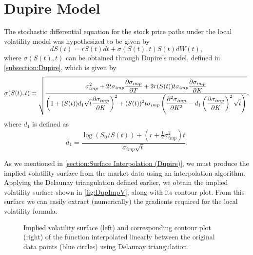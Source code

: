\section{Dupire Model}
The stochastic differential equation for the stock price paths under the local volatility model was hypothesized to be given by
\begin{equation}\label{dupmodds}
dS(t)=rS(t)dt+\sigma(S(t),t)S(t)dW(t),
\end{equation}
\noindent where $\sigma(S(t),t)$ can be obtained through Dupire's model, defined in \autoref{subsection:Dupire}, which is given by
\begin{equation}
\sigma(S(t),t)=\sqrt{\frac{\displaystyle\sigma_{imp}^2+2t\sigma_{imp}\pdv{\sigma_{imp}}{T}+2r(S(t))t\sigma_{imp}\pdv{\sigma_{imp}}{K}}{\displaystyle\left(1+(S(t))d_1\sqrt{t}\pdv{\sigma_{imp}}{K}\right)^2+(S(t))^2t\sigma_{imp}\left(\pdv{^2\sigma_{imp}}{K^2}-d_1\left(\pdv{\sigma_{imp}}{K}\right)^2\sqrt{t}\right)}},
\end{equation}
\noindent where $d_1$ is defined as
\begin{equation}
d_1=\frac{\log(S_0/S(t))+\left(r+\frac{1}{2}\sigma_{imp}^2\right)t}{\sigma_{imp}\sqrt{t}}.
\end{equation}

As we mentioned in \autoref{section:Surface Interpolation (Dupire)}, we must produce the implied volatility surface from the market data using an interpolation algorithm. Applying the Delaunay triangulation defined earlier, we obtain the implied volatility surface shown in \autoref{fig:DupImpV}, along with its contour plot.
From this surface we can easily extract (numerically) the gradients required for the local volatility formula.



\begin{figure}[H]
  \begin{subfigmatrix}{2}
  \end{subfigmatrix}
    \caption[Implied volatility surface and corresponding contour plot of the function interpolated linearly between the original data points using Delaunay triangulation.]{Implied volatility surface (left) and corresponding contour plot (right) of the function interpolated linearly between the original data points (blue circles) using Delaunay triangulation.}\label{fig:DupImpV}
\end{figure}   


